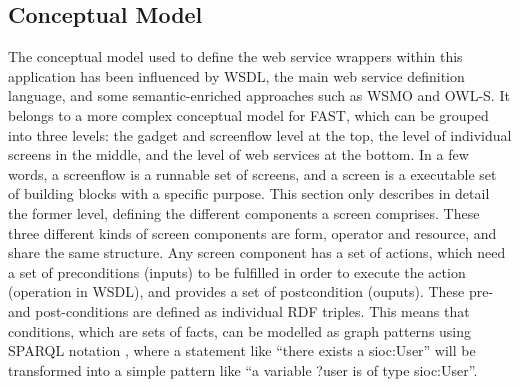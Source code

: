 
\subsection{Conceptual Model}
\label{ssec:ontology}
The conceptual model used to define the web service wrappers within this application has been influenced by WSDL, the main web service definition language, and some semantic-enriched approaches such as WSMO and OWL-S. It belongs to a more complex conceptual model for FAST, which can be grouped into three levels: the gadget and screenflow level at the top, the level of individual screens in the middle, and the level of web services at the bottom. In a few words, a screenflow is a runnable set of screens, and a screen is a executable set of building blocks with a specific purpose. This section only describes in detail the former level, defining the different components a screen comprises. These three different kinds of screen components are form, operator and resource, and share the same structure. Any screen component has a set of actions, which need a set of preconditions (inputs) to be fulfilled in order to execute the action (operation in WSDL), and provides a set of postcondition (ouputs). These pre- and post-conditions are defined as individual RDF triples. This means that conditions, which are sets of facts, can be modelled as graph patterns using SPARQL notation \cite{sparql2008spec}, where a statement like ``there exists a sioc:User'' will be transformed into a simple pattern like ``a variable ?user is of type sioc:User''. 

